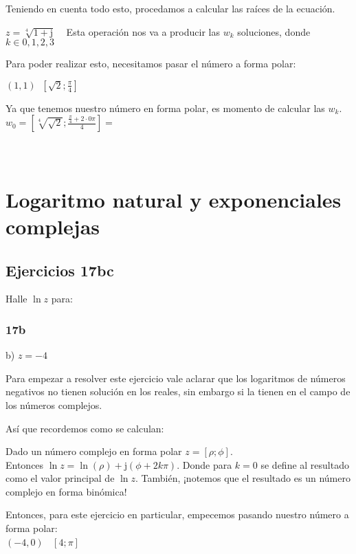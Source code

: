 \documentclass[11pt]{article}
\def\imj{\mathrm{j}}
\begin{document}
	Teniendo en cuenta todo esto, procedamos a calcular las raíces de la ecuación.
	
	$z=\sqrt[4]{1+\imj} \;\;\;$ Esta operación nos va a producir las $w_{k}$ soluciones, donde $k\in{0,1,2,3}$
	
	Para poder realizar esto, necesitamos pasar el número a forma polar:
	
	$\left(1,1\right)\;$\textrightarrow$\;\left[\sqrt{2};\frac{\pi}{4}\right]$
	
	Ya que tenemos nuestro número en forma polar, es momento de calcular las $w_{k}$.\\
	$w_{0}=\left[\sqrt[4]{\sqrt{2}};\frac{\frac{\pi}{4}+2\cdot0\pi}{4}\right]=$\\
	\\
	\\
	\section{Logaritmo natural y exponenciales complejas}
	\subsection{Ejercicios 17bc}
	Halle $\ln z$ para:
	\subsubsection{17b}
	b) $z=-4$
	
	Para empezar a resolver este ejercicio vale aclarar que los logaritmos de números negativos no tienen solución en los reales, sin embargo si la tienen en el campo de los números complejos.
	
	Así que recordemos como se calculan:
	
	Dado un número complejo en forma polar $z=\left[\rho;\phi\right]$. \\
	Entonces $\ln z = \ln(\rho) + \imj\left(\phi + 2k\pi\right)$. Donde para $k=0$ se define al resultado como el valor principal de $\ln z$. También, ¡notemos que el resultado es un número complejo en forma binómica!
	
	Entonces, para este ejercicio en particular, empecemos pasando nuestro número a forma polar:\\
	$\left(-4, 0\right)\;$ \textrightarrow $\;\left[4;\pi\right]$
	
\end{document}
